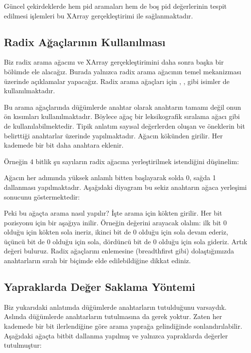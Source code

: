 \documentclass[a4paper,10pt,turkish]{sphinxmanual}
\begin{document}
\sphinxAtStartPar
Güncel çekirdeklerde hem pid aramaları hem de boş pid değerlerinin tespit edilmesi işlemleri bu XArray
gerçekleştirimi ile sağlanmaktadır.


\subsection{Radix Ağaçlarının Kullanılması}
\label{\detokenize{processcontrolblock:radix-agaclarinin-kullanilmasi}}
\sphinxAtStartPar
Biz radix arama ağacını ve XArray gerçekleştirimini daha sonra başka bir bölümde ele alacağız. Burada
yalnızca radix arama ağacının temel mekanizması üzerinde açıklamalar yapacağız. Radix arama ağaçları
için , ,
 gibi isimler de kullanılmaktadır.

\sphinxAtStartPar
Bu arama ağaçlarında düğümlerde anahtar olarak anahtarın tamamı değil onun ön kısımları kullanılmaktadır.
Böylece ağaç bir leksikografik sıralama ağacı gibi de kullanılabilmektedir. Tipik anlatım sayısal
değerlerden oluşan ve öneklerin bit belirttiği anahtarlar üzerinde yapılmaktadır. Ağacın kökünden
girilir. Her kademede bir bit daha anahtara eklenir.

\sphinxAtStartPar
Örneğin 4 bitlik şu sayıların radix ağacına yerleştirilmek istendiğini düşünelim:

\sphinxAtStartPar
Ağacın her adımında yüksek anlamlı bitten başlayarak solda 0, sağda 1 dallanması yapılmaktadır.
Aşağıdaki diyagram bu sekiz anahtarın ağaca yerleşimi sonucunu göstermektedir:


\sphinxAtStartPar
Peki bu ağaçta arama nasıl yapılır? İşte arama için kökten girilir. Her bit pozisyonu için bir aşağıya
inilir. Örneğin  değerini arayacak olalım: ilk bit 0 olduğu için kökten sola ineriz, ikinci bit
de 0 olduğu için sola devam ederiz, üçüncü bit de 0 olduğu için sola, dördüncü bit de 0 olduğu için
sola gideriz. Artık değeri buluruz. Radix ağaçlarını enlemesine (breadth\sphinxhyphen{}first gibi) dolaştığımızda
anahtarların sıralı bir biçimde elde edilebildiğine dikkat ediniz.


\subsection{Yapraklarda Değer Saklama Yöntemi}
\label{\detokenize{processcontrolblock:yapraklarda-deger-saklama-yontemi}}
\sphinxAtStartPar
Biz yukarıdaki anlatımda düğümlerde anahtarların tutulduğunu varsaydık. Aslında düğümlerde anahtarların
tutulmasına da gerek yoktur. Zaten her kademede bir bit ilerlendiğine göre arama yaprağa gelindiğinde
sonlandırılabilir. Aşağıdaki ağaçta bit\sphinxhyphen{}bit dallanma yapılmış ve yalnızca yapraklarda değerler
tutulmuştur:
\end{document}
